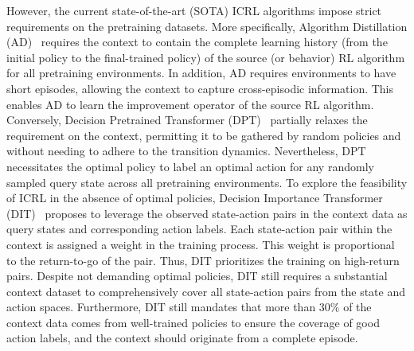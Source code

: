 %
However, the current state-of-the-art (SOTA) ICRL algorithms impose strict requirements on the pretraining datasets. More specifically, Algorithm Distillation (AD)~\citep{laskin2022context} requires the context to contain the complete learning history (from the initial policy to the final-trained policy) of the source (or behavior) RL algorithm for all pretraining environments. In addition, AD requires environments to have short episodes, allowing the context to capture cross-episodic information. This enables AD to learn the improvement operator of the source RL algorithm.
%
Conversely, Decision Pretrained Transformer (DPT)~\citep{lee2024supervised} {partially relaxes the} requirement on the context, permitting it to be gathered by random policies and without needing to adhere to the transition dynamics. Nevertheless, DPT necessitates the optimal policy to label an optimal action for any randomly sampled query state across all pretraining environments.
%
To explore the feasibility of ICRL in the absence of optimal policies, Decision Importance Transformer (DIT)~\citep{dong2024context} proposes to leverage the observed state-action pairs in the context data as query states and corresponding action labels. Each state-action pair within the context is assigned a weight in the training process. This weight is proportional to the return-to-go of the pair. Thus, DIT prioritizes the training on high-return pairs.
%
Despite not demanding optimal policies, DIT still requires a substantial context dataset to comprehensively cover all state-action pairs from the state and action spaces. Furthermore, DIT still mandates that more than $30\%$ of the context data comes from well-trained policies to ensure the coverage of good action labels, and the context should originate from a complete episode.
%

